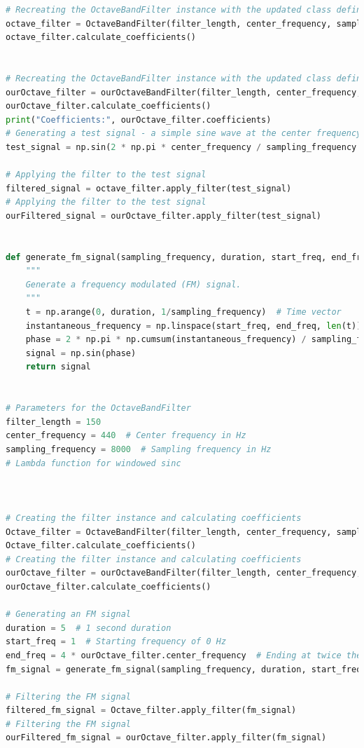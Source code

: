 \documentclass[a4paper, 11pt]{exam}
\begin{document}
\begin{lstlisting}[language=Python]
# Recreating the OctaveBandFilter instance with the updated class definition
octave_filter = OctaveBandFilter(filter_length, center_frequency, sampling_frequency)
octave_filter.calculate_coefficients()


# Recreating the OctaveBandFilter instance with the updated class definition
ourOctave_filter = ourOctaveBandFilter(filter_length, center_frequency, sampling_frequency, windowed_sinc)
ourOctave_filter.calculate_coefficients()
print("Coefficients:", ourOctave_filter.coefficients)
# Generating a test signal - a simple sine wave at the center frequency
test_signal = np.sin(2 * np.pi * center_frequency / sampling_frequency * np.arange(0, sampling_frequency))

# Applying the filter to the test signal
filtered_signal = octave_filter.apply_filter(test_signal)
# Applying the filter to the test signal
ourFiltered_signal = ourOctave_filter.apply_filter(test_signal)


def generate_fm_signal(sampling_frequency, duration, start_freq, end_freq):
    """
    Generate a frequency modulated (FM) signal.
    """
    t = np.arange(0, duration, 1/sampling_frequency)  # Time vector
    instantaneous_frequency = np.linspace(start_freq, end_freq, len(t))
    phase = 2 * np.pi * np.cumsum(instantaneous_frequency) / sampling_frequency
    signal = np.sin(phase)
    return signal


# Parameters for the OctaveBandFilter
filter_length = 150
center_frequency = 440  # Center frequency in Hz
sampling_frequency = 8000  # Sampling frequency in Hz
# Lambda function for windowed sinc



# Creating the filter instance and calculating coefficients
Octave_filter = OctaveBandFilter(filter_length, center_frequency, sampling_frequency)
Octave_filter.calculate_coefficients()
# Creating the filter instance and calculating coefficients
ourOctave_filter = ourOctaveBandFilter(filter_length, center_frequency, sampling_frequency, windowed_sinc)
ourOctave_filter.calculate_coefficients()

# Generating an FM signal
duration = 5  # 1 second duration
start_freq = 1  # Starting frequency of 0 Hz
end_freq = 4 * ourOctave_filter.center_frequency  # Ending at twice the center frequency of the filter
fm_signal = generate_fm_signal(sampling_frequency, duration, start_freq, end_freq)

# Filtering the FM signal
filtered_fm_signal = Octave_filter.apply_filter(fm_signal)
# Filtering the FM signal
ourFiltered_fm_signal = ourOctave_filter.apply_filter(fm_signal)


\end{lstlisting}
\end{document}
